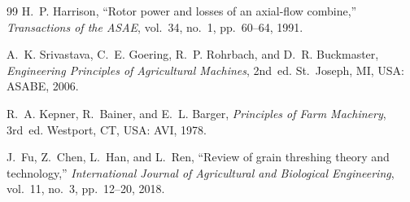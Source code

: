 \begin{thebibliography}{99}
H.~P. Harrison,
``Rotor power and losses of an axial-flow combine,''
\emph{Transactions of the ASAE}, vol.~34, no.~1, pp.~60--64, 1991.

A.~K. Srivastava, C.~E. Goering, R.~P. Rohrbach, and D.~R. Buckmaster,
\emph{Engineering Principles of Agricultural Machines}, 2nd~ed.
St.~Joseph, MI, USA: ASABE, 2006.

R.~A. Kepner, R.~Bainer, and E.~L. Barger,
\emph{Principles of Farm Machinery}, 3rd~ed.
Westport, CT, USA: AVI, 1978.

J.~Fu, Z.~Chen, L.~Han, and L.~Ren,
``Review of grain threshing theory and technology,''
\emph{International Journal of Agricultural and Biological Engineering}, vol.~11, no.~3, pp.~12--20, 2018.

\end{thebibliography}
